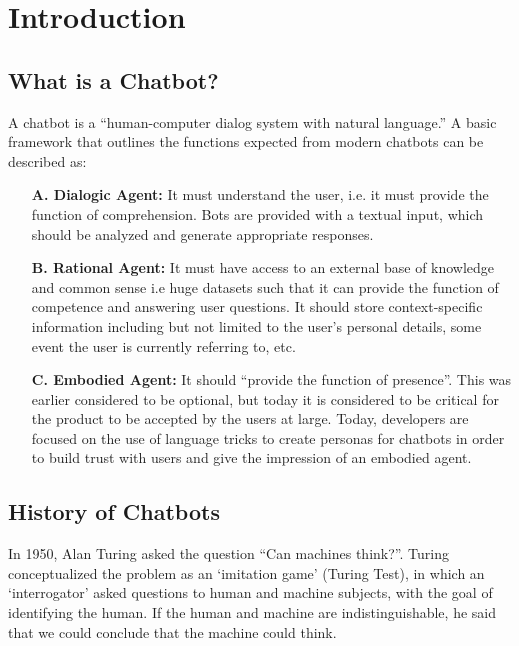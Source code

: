 %

\chapter{Introduction}
\section{What is a Chatbot?}
A chatbot is a “human-computer dialog system with natural language.”  A basic
framework that outlines the functions expected from modern chatbots can be
described as:

\begin{itemize}[align=left]
	\item [\textbf{A. Dialogic Agent:}] It must understand the user, i.e. it
		must provide the function of comprehension. Bots are provided
		with a textual input, which should be analyzed and generate
		appropriate responses.

	\item [\textbf{B. Rational Agent:}] It must have access to an external
		base of knowledge and common sense i.e huge datasets such that
		it can provide the function of competence and answering user
		questions. It should store context-specific information
		including but not limited to the user’s personal details, some
		event the user is currently referring to, etc.

	\item [\textbf{C. Embodied Agent:}] It should “provide the function of
		presence”. This was earlier considered to be optional, but today
		it is considered to be critical for the product to be accepted
		by the users at large. Today, developers are focused on the use
		of language tricks to create personas for chatbots in order to
		build trust with users and give the impression of an embodied
		agent.

\end{itemize}

\section{History of Chatbots}
In 1950, Alan Turing asked the question “Can machines think?”. Turing
conceptualized the problem as an ‘imitation game’ (Turing Test), in which an
‘interrogator’ asked questions to human and machine subjects, with the goal of
identifying the human. If the human and machine are indistinguishable, he said
that we could conclude that the machine could think. 

